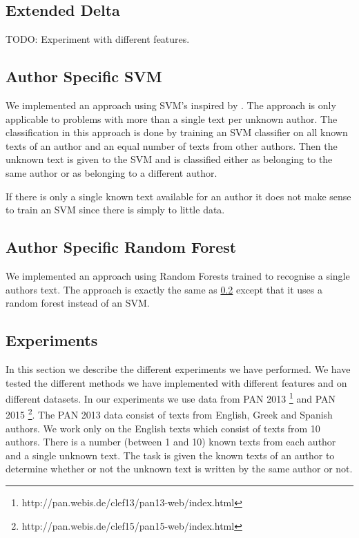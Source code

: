 \subsection{Extended Delta}
TODO: Experiment with different features.

\subsection{Author Specific SVM} \label{subsec:author_specific_svm}
We implemented an approach using \gls{SVM}'s inspired by \cite{hansen2014}. The
approach is only applicable to problems with more than a single text per
unknown author. The classification in this approach is done by training an \gls{SVM}
classifier on all known texts of an author and an equal number of texts from
other authors. Then the unknown text is given to the \gls{SVM} and is classified
either as belonging to the same author or as belonging to a different author.

If there is only a single known text available for an author it does not make
sense to train an \gls{SVM} since there is simply to little data.

\subsection{Author Specific Random Forest}
We implemented an approach using Random Forests trained to recognise a single
authors text. The approach is exactly the same as
\ref{subsec:author_specific_svm} except that it uses a random forest instead of
an \gls{SVM}.

\subsection{Experiments}
In this section we describe the different experiments we have performed.
We have tested the different methods we have implemented with different
features and on different datasets. In our experiments we use data from PAN
2013 \footnote{http://pan.webis.de/clef13/pan13-web/index.html} and PAN 2015
\footnote{http://pan.webis.de/clef15/pan15-web/index.html}. The PAN 2013 data
consist of texts from English, Greek and Spanish authors. We work only on the
English texts which consist of texts from 10 authors. There is a number (between
1 and 10) known texts from each author and a single unknown text. The task is
given the known texts of an author to determine whether or not the unknown text
is written by the same author or not.


